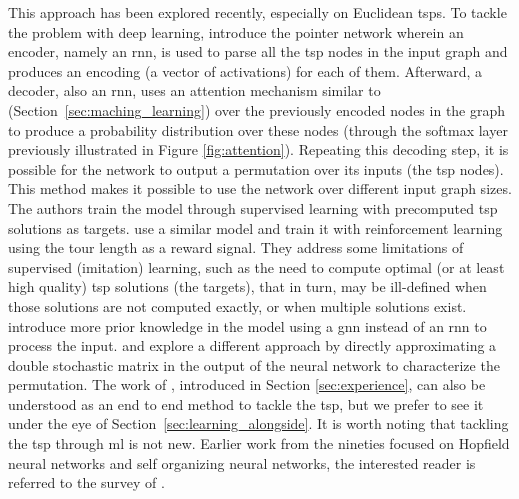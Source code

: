 \documentclass[11pt]{article}
\begin{document}
		This approach has been explored recently, especially on Euclidean \glspl{tsp}.
		To tackle the problem with deep learning, \cite{VinyalsPointerNetworks2015} introduce the pointer
		network wherein an encoder, namely an \gls{rnn}, is used to parse all the \gls{tsp} nodes in the
		input graph and produces an encoding (a vector of activations) for each of them.
		Afterward, a decoder, also an \gls{rnn}, uses an attention mechanism similar
		to~\citet{Bahdanau-et-al-ICLR2015-small} (Section~\ref{sec:maching_learning}) over the previously
		encoded nodes in the graph to produce a probability
		distribution over these nodes (through the softmax layer previously illustrated in Figure
		\ref{fig:attention}).
		Repeating this decoding step, it is possible for the network to output a permutation over its
		inputs (the \gls{tsp} nodes).
		This method makes it possible to use the network over different input graph sizes.
		The authors train the model through supervised learning with precomputed \gls{tsp} solutions as
		targets.
		\cite{BelloNeuralCombinatorialOptimization2016} use a similar model and train it with
		reinforcement learning using the tour length as a reward signal.
		They address some limitations of supervised (imitation) learning, such as the need to compute
		optimal (or at least high quality) \gls{tsp} solutions (the targets), that in turn, may be
		ill-defined when those solutions are not computed exactly, or when multiple solutions exist.
		\cite{KoolAttentionSolvesYour2018} introduce more prior knowledge in the model using a \gls{gnn}
		instead of an \gls{rnn} to process the input.
		\cite{EmamiLearningPermutationsSinkhorn2018} and \cite{NowakNoteLearningAlgorithms2017}
		explore a different approach by directly approximating a double stochastic matrix in the output of
		the neural network to characterize the permutation.
		The work of \cite{KhalilLearningCombinatorialOptimization2017}, introduced in Section
		\ref{sec:experience}, can also be understood as an end to end method to tackle the \gls{tsp}, but
		we prefer to see it under the eye of Section~\ref{sec:learning_alongside}.
		It is worth noting that tackling the \gls{tsp} through \gls{ml} is not new.
		Earlier work from the nineties focused on Hopfield neural networks and self organizing neural
		networks, the interested reader is referred to the survey of
		\cite{SmithNeuralNetworksCombinatorial1999}.
\end{document}
